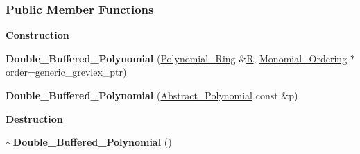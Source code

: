\subsubsection*{Public Member Functions}
\begin{Indent}\textbf{ Construction}\par
\begin{DoxyCompactItemize}
\item 
\mbox{\label{group__polygroup_ab663800f31484a5d55ec9363e7669f56}} 
{\bfseries Double\+\_\+\+Buffered\+\_\+\+Polynomial} (\hyperlink{group__polygroup_class_polynomial___ring}{Polynomial\+\_\+\+Ring} \&\hyperlink{group__polygroup_a551ade20b7dcd96c227dd0401f6ffbbe}{R}, \hyperlink{group__orderinggroup_class_monomial___ordering}{Monomial\+\_\+\+Ordering} $\ast$order=generic\+\_\+grevlex\+\_\+ptr)
\item 
\mbox{\label{group__polygroup_ace854a5e7d0fac35ad2d9469a34656a7}} 
{\bfseries Double\+\_\+\+Buffered\+\_\+\+Polynomial} (\hyperlink{group__polygroup_class_abstract___polynomial}{Abstract\+\_\+\+Polynomial} const \&p)
\end{DoxyCompactItemize}
\end{Indent}
\begin{Indent}\textbf{ Destruction}\par
\begin{DoxyCompactItemize}
\item 
\mbox{\label{group__polygroup_a61b7620ea7b3b7ba3db0b96065458166}} 
{\bfseries $\sim$\+Double\+\_\+\+Buffered\+\_\+\+Polynomial} ()
\end{DoxyCompactItemize}
\end{Indent}
